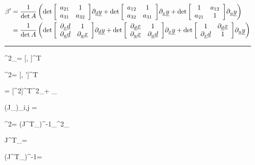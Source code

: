 \begin{align}
\beta'&=
\frac{1}{\det A}
\left(
\det{\left[
\begin{array}{cc}
a_{21}&1
\\
a_{31}&a_{32}
\end{array}
\right]}\partial_{\underline{d}}{\underline{y}}
+
\det{\left[
\begin{array}{cc}
a_{12}&1
\\
a_{32}&a_{31}
\end{array}
\right]}\partial_{\underline{x}}{\underline{y}}
+
\det{\left[
\begin{array}{cc}
1&a_{12}
\\
a_{21}&1
\end{array}
\right]}\partial_{\underline{u}}{\underline{y}}
\right)
\\
&=
\frac{1}{\det A}
\left(
\det{\left[
\begin{array}{cc}
\partial_{\underline{x}}{\underline{d}}&1
\\
\partial_{\underline{u}}{\underline{d}}&\partial_{\underline{u}}{\underline{x}}\end{array}
\right]}\partial_{\underline{d}}{\underline{y}}
+
\det{\left[
\begin{array}{cc}
\partial_{\underline{d}}{\underline{x}}&1
\\
\partial_{\underline{u}}{\underline{x}}&\partial_{\underline{u}}{\underline{d}}\end{array}
\right]}\partial_{\underline{x}}{\underline{y}}
+
\det{\left[
\begin{array}{cc}
1&\partial_{\underline{d}}{\underline{x}}\\
\partial_{\underline{x}}{\underline{d}}&1
\end{array}
\right]}\partial_{\underline{u}}{\underline{y}}
\right)
\end{align}

\hrule

\beq
\rvx^2_\alp = [\rvx, \rvu]^T
\eeq

\beq
\alp^2= [\alp, \alp']^T
\eeq

\beq
\rvd = [\alp^2]^T\rvx^2_\alp + \eps_\rvd
\eeq

\beq
(J_\alp)_{i,j} =
\eeq

\beq
\alp^2=
(J^T_\alp)^{-1}\nabla_{\rvx^2_\alp}\rvd
\eeq

\beq
J^T_\alp=
\eeq

\beq
(J^T_\alp)^{-1}=
\eeq

